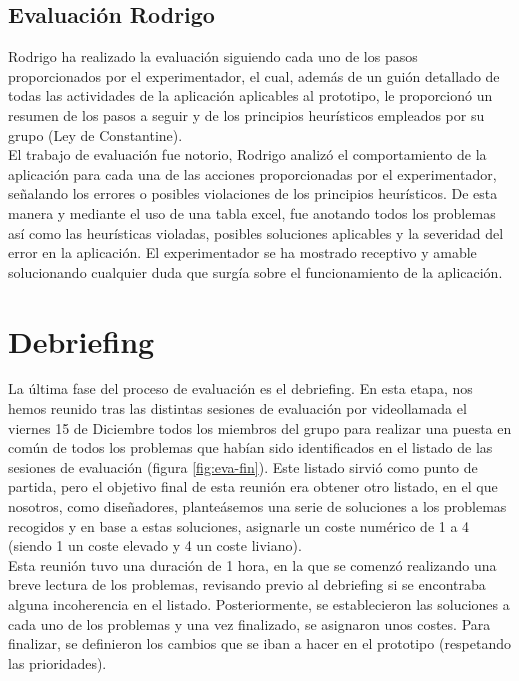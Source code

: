 \subsection{Evaluación Rodrigo}
Rodrigo ha realizado la evaluación siguiendo cada uno de los pasos proporcionados por el experimentador, el cual, además de un guión detallado de todas las actividades
de la aplicación aplicables al prototipo, le proporcionó un resumen de los pasos a seguir y de los principios heurísticos empleados por su grupo (Ley de Constantine). \\

El trabajo de evaluación fue notorio, Rodrigo analizó el comportamiento de la aplicación para cada una de las acciones proporcionadas por el experimentador, señalando 
los errores o posibles violaciones de los principios heurísticos. De esta manera y mediante el uso de una tabla excel, fue anotando todos los problemas así como 
las heurísticas violadas, posibles soluciones aplicables y la severidad del error en la aplicación. El experimentador se ha mostrado receptivo y amable solucionando 
cualquier duda que surgía sobre el funcionamiento de la aplicación.

\section{Debriefing}
La última fase del proceso de evaluación es el debriefing. En esta etapa, nos hemos reunido tras las distintas sesiones de evaluación por videollamada el viernes 15 de
Diciembre todos los miembros del grupo para realizar una puesta en común de todos los problemas que habían sido identificados en el listado de las sesiones de evaluación
(figura \ref{fig:eva-fin}). Este listado sirvió como punto de partida, pero el objetivo final de esta reunión era obtener otro listado, en el que nosotros, como diseñadores,
planteásemos una serie de soluciones a los problemas recogidos y en base a estas soluciones, asignarle un coste numérico de 1 a 4 (siendo 1 un coste elevado y 4 un coste
liviano). \\

Esta reunión tuvo una duración de 1 hora, en la que se comenzó realizando una breve lectura de los problemas, revisando previo al debriefing si se encontraba alguna
incoherencia en el listado. Posteriormente, se establecieron las soluciones a cada uno de los problemas y una vez finalizado, se asignaron unos costes. Para finalizar, se
definieron los cambios que se iban a hacer en el prototipo (respetando las prioridades). \\

